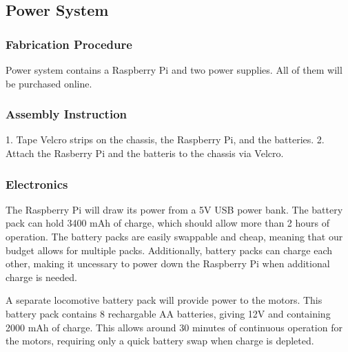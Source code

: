 
\subsection{Power System}
\label{sec:hardware_power}

\subsubsection{Fabrication Procedure}
\label{sec:power_fab}
Power system contains a Raspberry Pi and two power supplies. All of them will be purchased online.

\subsubsection{Assembly Instruction}
\label{sec:power_assemb}
1. Tape Velcro strips on the chassis, the Raspberry Pi, and the batteries.
2. Attach the Rasberry Pi and the batteris to the chassis via Velcro. 

\subsubsection{Electronics}
\label{sec:power_electronics}
The Raspberry Pi will draw its power from a 5V USB power bank. The battery pack can hold 3400 mAh of charge, which should allow more than 2 hours of operation. The battery packs are easily swappable and cheap, meaning that our budget allows for multiple packs. Additionally, battery packs can charge each other, making it uncessary to power down the Raspberry Pi when additional charge is needed.

A separate locomotive battery pack will provide power to the motors. This battery pack contains 8 rechargable AA batteries, giving 12V and containing 2000 mAh of charge. This allows around 30 minutes of continuous operation for the motors, requiring only a quick battery swap when charge is depleted.